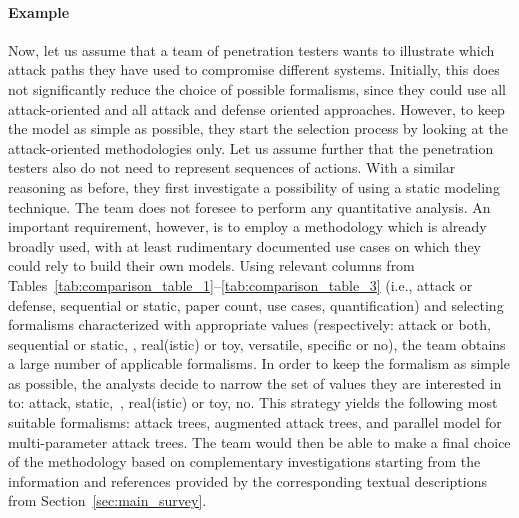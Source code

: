 \documentclass[a4paper]{article}
\begin{document}
\paragraph{Example \theexmpl}

Now, let us assume that a team of penetration testers wants to illustrate which
attack paths they have used to compromise different systems. Initially, this
does not significantly reduce the choice of possible formalisms, since they
could use all attack-oriented and all attack and defense oriented approaches.
However, to  keep the model as simple as possible, they start the selection
process by  looking at the attack-oriented methodologies only. Let us assume
further that the penetration testers also do not need to represent sequences of
actions.  With a similar reasoning as before, they first investigate a
possibility of using a static modeling technique. The team does not foresee to
perform any quantitative analysis. An important requirement, however, is to
employ a methodology which is already broadly used, with at least rudimentary
documented use cases on which they could rely to build their own models. Using
relevant columns from
Tables~\ref{tab:comparison_table_1}--\ref{tab:comparison_table_3}  (i.e., attack
or defense, sequential or static, paper count, use cases,  quantification) and
selecting formalisms characterized with appropriate values (respectively:  
attack or both, sequential or static, , real(istic) or toy, versatile,
specific or no), the team obtains a  large number of applicable formalisms. In
order to keep the formalism as simple  as possible, the analysts decide to
narrow the set of values they are  interested in to: attack, static,~,
real(istic) or toy, no. This strategy  yields the following most suitable
formalisms: attack trees, augmented attack  trees, and parallel model for
multi-parameter attack trees. The team would then be able to make a final choice
of the methodology based on complementary investigations starting from the
information and references provided by the corresponding textual descriptions
from Section~\ref{sec:main_survey}.
\end{document}
